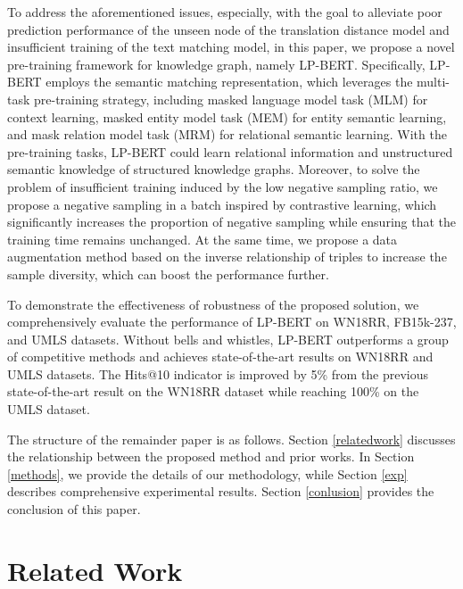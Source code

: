 \documentclass[journal]{IEEEtran}
\begin{document}
To address the aforementioned issues, especially, with the goal to alleviate poor prediction performance of the unseen node of the translation distance model and insufficient training of the text matching model, in this paper, we propose a novel pre-training framework for knowledge graph, namely LP-BERT. 
Specifically, LP-BERT employs the semantic matching representation, which leverages the multi-task pre-training strategy, including masked language model task (MLM) for context learning, masked entity model task (MEM) for entity semantic learning, and mask relation model task (MRM) for relational semantic learning. With the pre-training tasks, LP-BERT could learn relational information and unstructured semantic knowledge of structured knowledge graphs. 
Moreover, to solve the problem of insufficient training induced by the low negative sampling ratio, we propose a negative sampling in a batch inspired by contrastive learning, which significantly increases the proportion of negative sampling while ensuring that the training time remains unchanged.
At the same time, we propose a data augmentation method based on the inverse relationship of triples to increase the sample diversity, which can boost the performance further. 

To demonstrate the effectiveness of robustness of the proposed solution, we comprehensively evaluate the performance of LP-BERT on WN18RR, FB15k-237, and UMLS datasets.
Without bells and whistles, LP-BERT outperforms a group of competitive methods \cite{song2021rot,gao2021quatde,peng2020lineare,zhang2020learning,wang2021structure} and achieves state-of-the-art results on WN18RR and UMLS datasets. The Hits@10 indicator is improved by 5\% from the previous state-of-the-art result on the WN18RR dataset while reaching 100\% on the UMLS dataset.

The structure of the remainder paper is as follows. Section \ref{relatedwork} discusses the relationship between the proposed method and prior works. In Section \ref{methods}, we provide the details of our methodology, while Section \ref{exp} describes comprehensive experimental results. Section \ref{conlusion} provides the conclusion of this paper.


\section{Related Work}{\label{relatedwork}}
\end{document}
